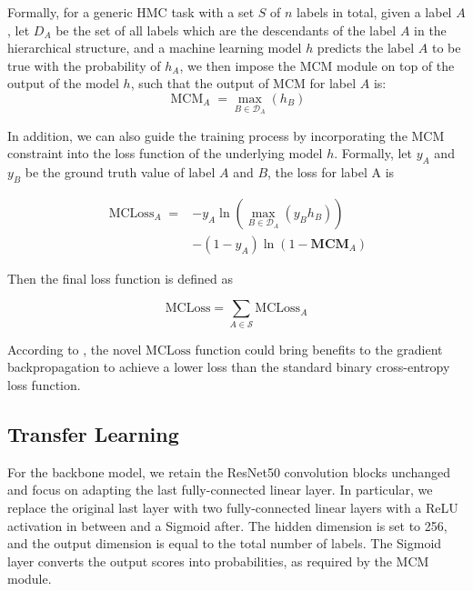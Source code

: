 \documentclass[wcp]{jmlr}
\begin{document}
Formally, for a generic HMC task with a set $S$ of $n$ labels in total, given a label $A$, let $D_A$ be the set of all labels which are the descendants of the label $A$ in the hierarchical structure, and a machine learning model $h$ predicts the label $A$ to be true with the probability of $h_A$, we then impose the MCM module on top of the output of the model $h$, such that the output of MCM for label $A$ is:
\begin{equation}\label{eq:mcm}
\operatorname{MCM}_A=\max_{B \in \mathcal{D}_A}\left(h_B\right)
\end{equation}

In addition, we can also guide the training process by incorporating the MCM constraint into the loss function of the underlying model $h$. Formally, let $y_A$ and $y_B$
be the ground truth value of label $A$ and $B$, the loss for label A is

\begin{equation}\label{eq:loss_a}
\begin{split}
\operatorname{MCLoss}_A = &-y_A \ln \left(\max _{B \in \mathcal{D}_A}\left(y_B h_B\right)\right) \\
&-\left(1-y_A\right) \ln \left(1-\mathbf{M C M}_A\right)
\end{split}
\end{equation}

Then the final loss function is defined as 

\begin{equation}\label{eq:loss_all}
\mathrm{MCLoss}=\sum_{A \in \mathcal{S}} \mathrm{MCLoss}_A
\end{equation}

According to  \cite{Giunchiglia01}, the novel $\mathrm{MCLoss}$ function could bring benefits to the gradient backpropagation to achieve a lower loss than the standard binary cross-entropy loss function.



\subsection{Transfer Learning}\label{sec:transferlearning}

For the backbone model, we retain the ResNet50 convolution blocks unchanged and focus on adapting the last fully-connected linear layer. %
In particular, we replace the original last layer with two fully-connected linear layers with a ReLU activation in between and a Sigmoid after. The hidden dimension is set to 256, and the output dimension is equal to the total number of labels. The Sigmoid layer converts the output scores into probabilities, as required by the MCM module.
\end{document}
